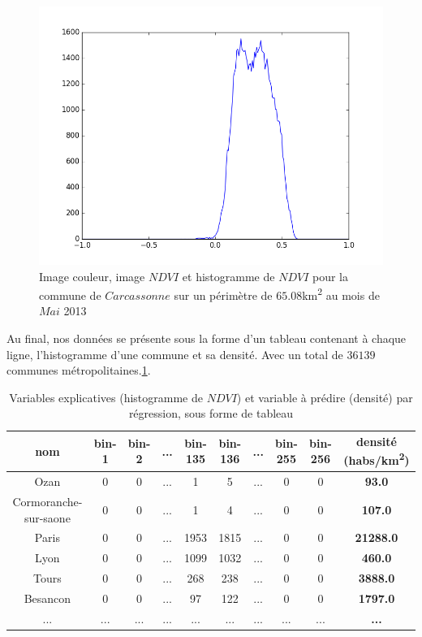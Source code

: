\documentclass{book}
\begin{document}
\begin{figure}[H]
{}
\begin{center}
\includegraphics[scale=0.45]{images/05_ndvi_histo.png}
\end{center}
\caption{Image couleur, image $NDVI$ et histogramme de $NDVI$ pour la commune de $Carcassonne$ sur un périmètre de $65.08$km\textsuperscript{2} au mois de $Mai$ 2013}
\label{ndvi_extraction}
\end{figure}

\clearpage

Au final, nos données se présente sous la forme d'un tableau contenant à chaque ligne, l'histogramme d'une commune et sa densité. Avec un total
de $36139$ communes métropolitaines.\ref{data_reg}.

\begin{table}[H]
\begin{center}
\begin{adjustbox}{max width=\textwidth}
\begin{tabular}{|c|c|c|c|c|c|c|c|c|>{\bfseries}c|}

\hline 
nom &  bin-1 & bin-2 & ... & bin-135 & bin-136 &... & bin-255 & bin-256 & densité (habs/km\textsuperscript{2}) \\
\hline 
Ozan & 0 & 0 & ... & 1 & 5 & ... & 0 & 0 & 93.0\\
\hline 
Cormoranche-sur-saone & 0 & 0 & ... & 1 & 4 & ... & 0 & 0 & 107.0\\
\hline 
Paris & 0 & 0 & ... & 1953 & 1815 & ... & 0 & 0 & 21288.0\\
\hline
Lyon & 0 & 0 & ... & 1099 & 1032 & ... & 0 & 0 & 460.0\\
\hline
Tours & 0 & 0 & ... & 268 & 238 & ... & 0 & 0 & 3888.0\\
\hline
Besancon & 0 & 0 & ... & 97 & 122 & ... & 0 & 0 & 1797.0\\
\hline 
... & ... & ... & ... & ... & ... & ... & ... & ... & ... \\
\hline
\end{tabular}
\end{adjustbox}
\end{center}
\caption{Variables explicatives (histogramme de $NDVI$) et variable à prédire (densité) par régression, sous forme de tableau}
\label{data_reg}
\end{table}
\end{document}
